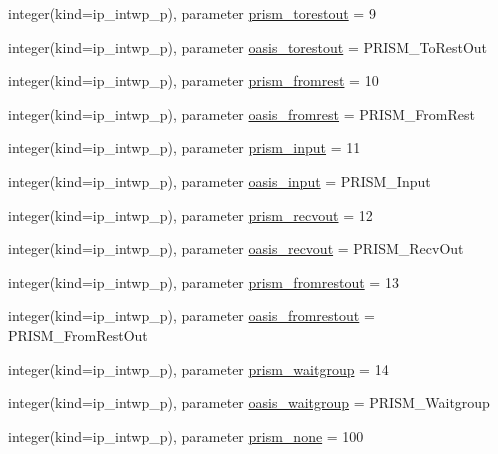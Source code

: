 \begin{DoxyCompactItemize}
\item 
integer(kind=ip\+\_\+intwp\+\_\+p), parameter \hyperlink{classmod__oasis__parameters_a9ed7a0f0a9392248de5b4b15849843df}{prism\+\_\+torestout} = 9
\item 
integer(kind=ip\+\_\+intwp\+\_\+p), parameter \hyperlink{classmod__oasis__parameters_a390018877602efede436bd0721add299}{oasis\+\_\+torestout} = P\+R\+I\+S\+M\+\_\+\+To\+Rest\+Out
\item 
integer(kind=ip\+\_\+intwp\+\_\+p), parameter \hyperlink{classmod__oasis__parameters_ad77e6f35280cf4e306f818f9ec815441}{prism\+\_\+fromrest} = 10
\item 
integer(kind=ip\+\_\+intwp\+\_\+p), parameter \hyperlink{classmod__oasis__parameters_aa0584909970d34364b7ec319292b1682}{oasis\+\_\+fromrest} = P\+R\+I\+S\+M\+\_\+\+From\+Rest
\item 
integer(kind=ip\+\_\+intwp\+\_\+p), parameter \hyperlink{classmod__oasis__parameters_aa9009f13473f2cb6476c2fb5e4963243}{prism\+\_\+input} = 11
\item 
integer(kind=ip\+\_\+intwp\+\_\+p), parameter \hyperlink{classmod__oasis__parameters_ae65ca856d776de249fc624b2d76bc4e8}{oasis\+\_\+input} = P\+R\+I\+S\+M\+\_\+\+Input
\item 
integer(kind=ip\+\_\+intwp\+\_\+p), parameter \hyperlink{classmod__oasis__parameters_ab56f2573ea7fd626f24e42606f4745a2}{prism\+\_\+recvout} = 12
\item 
integer(kind=ip\+\_\+intwp\+\_\+p), parameter \hyperlink{classmod__oasis__parameters_ac7406e7f558491599acfbb6f4628f811}{oasis\+\_\+recvout} = P\+R\+I\+S\+M\+\_\+\+Recv\+Out
\item 
integer(kind=ip\+\_\+intwp\+\_\+p), parameter \hyperlink{classmod__oasis__parameters_ac989a8af875dd1765b1369814fd4eb9d}{prism\+\_\+fromrestout} = 13
\item 
integer(kind=ip\+\_\+intwp\+\_\+p), parameter \hyperlink{classmod__oasis__parameters_a76a87a170e0c08863ae981693eb88fb8}{oasis\+\_\+fromrestout} = P\+R\+I\+S\+M\+\_\+\+From\+Rest\+Out
\item 
integer(kind=ip\+\_\+intwp\+\_\+p), parameter \hyperlink{classmod__oasis__parameters_ae5cbdfb558e82bfb8695a8cf425780cb}{prism\+\_\+waitgroup} = 14
\item 
integer(kind=ip\+\_\+intwp\+\_\+p), parameter \hyperlink{classmod__oasis__parameters_a2cc23572d33c536d49a53587359b68f0}{oasis\+\_\+waitgroup} = P\+R\+I\+S\+M\+\_\+\+Waitgroup
\item 
integer(kind=ip\+\_\+intwp\+\_\+p), parameter \hyperlink{classmod__oasis__parameters_a81e4e20be511cd8be2ab3881b42f8f3e}{prism\+\_\+none} = 100

\end{DoxyCompactItemize}

